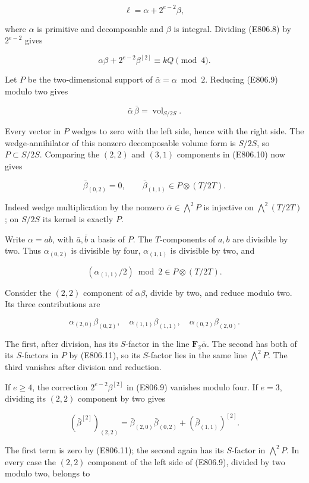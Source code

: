 \[
 \ell=\alpha+2^{e-2}\beta,
\]

where \(\alpha\) is primitive and decomposable and \(\beta\) is
integral. Dividing (E806.8) by \(2^{e-2}\) gives

\[
 \alpha\beta+2^{e-2}\beta^{[2]}\equiv kQ\pmod4.
 \tag{E806.9}
\]

Let \(P\) be the two-dimensional support of \(\bar\alpha=\alpha\bmod2\).
Reducing (E806.9) modulo two gives

\[
 \bar\alpha\,\bar\beta=\operatorname{vol}_{S/2S}.
 \tag{E806.10}
\]

Every vector in \(P\) wedges to zero with the left side, hence with the
right side. The wedge-annihilator of this nonzero decomposable volume
form is \(S/2S\), so \(P\subset S/2S\). Comparing the \((2,2)\) and
\((3,1)\) components in (E806.10) now gives

\[
 \bar\beta_{(0,2)}=0,\qquad
 \bar\beta_{(1,1)}\in P\otimes(T/2T).
 \tag{E806.11}
\]

Indeed wedge multiplication by the nonzero \(\bar\alpha\in\bigwedge^2P\)
is injective on \(\bigwedge^2(T/2T)\); on \(S/2S\) its kernel is exactly
\(P\).

Write \(\alpha=a b\), with \(\bar a,\bar b\) a basis of \(P\). The
\(T\)-components of \(a,b\) are divisible by two. Thus
\(\alpha_{(0,2)}\) is divisible by four, \(\alpha_{(1,1)}\) is divisible
by two, and

\[
 (\alpha_{(1,1)}/2)\bmod2\in P\otimes(T/2T).
\]

Consider the \((2,2)\) component of \(\alpha\beta\), divide by two, and
reduce modulo two. Its three contributions are

\[
 \alpha_{(2,0)}\beta_{(0,2)},\quad
 \alpha_{(1,1)}\beta_{(1,1)},\quad
 \alpha_{(0,2)}\beta_{(2,0)}.
\]

The first, after division, has its \(S\)-factor in the line
\(\mathbf F_2\bar\alpha\). The second has both of its \(S\)-factors in
\(P\) by (E806.11), so its \(S\)-factor lies in the same line
\(\bigwedge^2P\). The third vanishes after division and reduction.

If \(e\ge4\), the correction \(2^{e-2}\beta^{[2]}\) in (E806.9) vanishes
modulo four. If \(e=3\), dividing its \((2,2)\) component by two gives

\[
 (\bar\beta^{[2]})_{(2,2)}
  =\bar\beta_{(2,0)}\bar\beta_{(0,2)}
     +(\bar\beta_{(1,1)})^{[2]}.
\]

The first term is zero by (E806.11); the second again has its
\(S\)-factor in \(\bigwedge^2P\). In every case the \((2,2)\) component
of the left side of (E806.9), divided by two modulo two, belongs to

